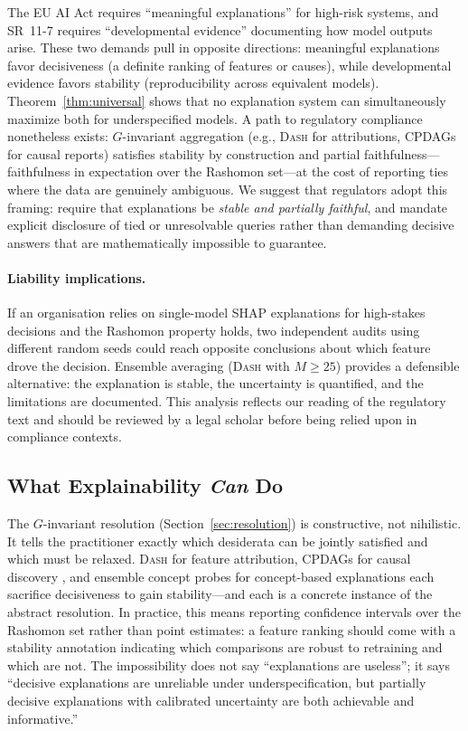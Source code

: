 \documentclass[11pt,a4paper]{article}
\newcommand{\DASH}{\textsc{Dash}}
\begin{document}
The EU AI Act \citep{euaiact2024} requires ``meaningful explanations'' for
high-risk systems, and SR~11-7 \citep{occ2011sr117} requires ``developmental
evidence'' documenting how model outputs arise.  These two demands pull in
opposite directions: meaningful explanations favor decisiveness (a definite
ranking of features or causes), while developmental evidence favors stability
(reproducibility across equivalent models).  Theorem~\ref{thm:universal} shows
that no explanation system can simultaneously maximize both for underspecified
models.  A path to regulatory compliance nonetheless exists: $G$-invariant
aggregation (e.g., \DASH{} for attributions, CPDAGs for causal reports)
satisfies stability by construction and partial faithfulness---faithfulness in
expectation over the Rashomon set---at the cost of reporting ties where the
data are genuinely ambiguous.  We suggest that regulators adopt this framing:
require that explanations be \emph{stable and partially faithful}, and mandate
explicit disclosure of tied or unresolvable queries rather than demanding
decisive answers that are mathematically impossible to guarantee.

\paragraph{Liability implications.}
If an organisation relies on single-model SHAP explanations for high-stakes decisions and the Rashomon property holds, two independent audits using different random seeds could reach opposite conclusions about which feature drove the decision. Ensemble averaging (\DASH{} with $M \geq 25$) provides a defensible alternative: the explanation is stable, the uncertainty is quantified, and the limitations are documented. This analysis reflects our reading of the regulatory text and should be reviewed by a legal scholar before being relied upon in compliance contexts.

\subsection[What Explainability Can Do]{What Explainability \emph{Can} Do}
\label{sec:can-do}

The $G$-invariant resolution (Section~\ref{sec:resolution}) is constructive, not
nihilistic.  It tells the practitioner exactly which desiderata can be jointly
satisfied and which must be relaxed.  \DASH{} for feature attribution, CPDAGs
for causal discovery \citep{verma1991equivalence}, and ensemble concept probes
for concept-based explanations \citep{kim2018tcav} each sacrifice decisiveness
to gain stability---and each is a concrete instance of the abstract resolution.
In practice, this means reporting confidence intervals over the Rashomon set
\citep{fisher2019models,semenova2022existence} rather than point estimates:
a feature ranking should come with a stability annotation indicating which
comparisons are robust to retraining and which are not.  The impossibility does
not say ``explanations are useless''; it says ``decisive explanations are
unreliable under underspecification, but partially decisive explanations with
calibrated uncertainty are both achievable and informative.''
\end{document}
